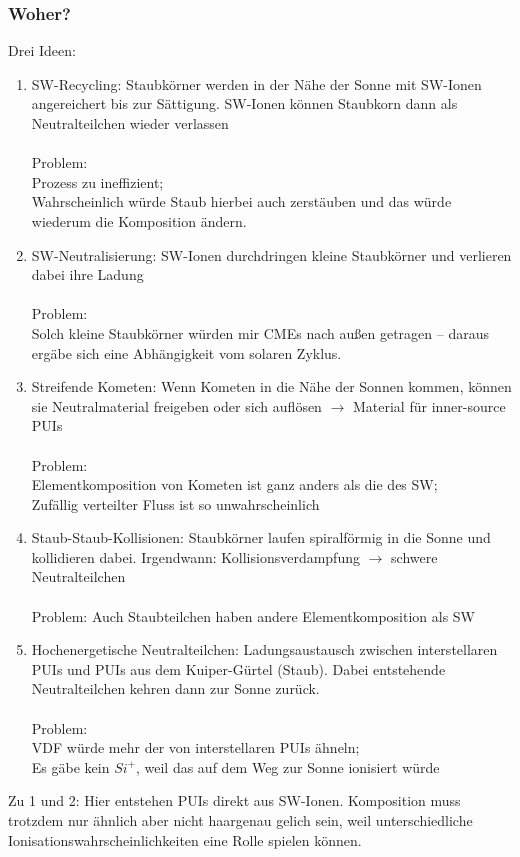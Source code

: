 \documentclass[]{article}
\begin{document}
\subsubsection{Woher?}
Drei Ideen:
\begin{enumerate}
	\item SW-Recycling: Staubkörner werden in der Nähe der Sonne mit SW-Ionen angereichert bis zur Sättigung. SW-Ionen können Staubkorn dann als Neutralteilchen wieder verlassen \\ \\
	Problem: \\
	Prozess zu ineffizient; \\
	Wahrscheinlich würde Staub hierbei auch zerstäuben und das würde wiederum die Komposition ändern.
	\item SW-Neutralisierung: SW-Ionen durchdringen kleine Staubkörner und verlieren dabei ihre Ladung \\ \\
	Problem: \\
	Solch kleine Staubkörner würden mir CMEs nach außen getragen -- daraus ergäbe sich eine Abhängigkeit vom solaren Zyklus.
	\item Streifende Kometen: Wenn Kometen in die Nähe der Sonnen kommen, können sie Neutralmaterial freigeben oder sich auflösen $\rightarrow$ Material für inner-source PUIs \\ \\
	Problem: \\
	Elementkomposition von Kometen ist ganz anders als die des SW; 
	\\ Zufällig verteilter Fluss ist so unwahrscheinlich
	\item Staub-Staub-Kollisionen: Staubkörner laufen spiralförmig in die Sonne und kollidieren dabei. Irgendwann: Kollisionsverdampfung $\rightarrow$ schwere Neutralteilchen \\ \\
	Problem: Auch Staubteilchen haben andere Elementkomposition als SW
	\item Hochenergetische Neutralteilchen: Ladungsaustausch zwischen interstellaren PUIs und PUIs aus dem Kuiper-Gürtel (Staub). Dabei entstehende Neutralteilchen kehren dann zur Sonne zurück. \\ \\
	Problem: \\
	VDF würde mehr der von interstellaren PUIs ähneln; \\
	Es gäbe kein $Si^+$, weil das auf dem Weg zur Sonne ionisiert würde
\end{enumerate}
Zu 1 und 2: Hier entstehen PUIs direkt aus SW-Ionen. Komposition muss trotzdem nur ähnlich aber nicht haargenau gelich sein, weil unterschiedliche Ionisationswahrscheinlichkeiten eine Rolle spielen können.
%
\end{document}
